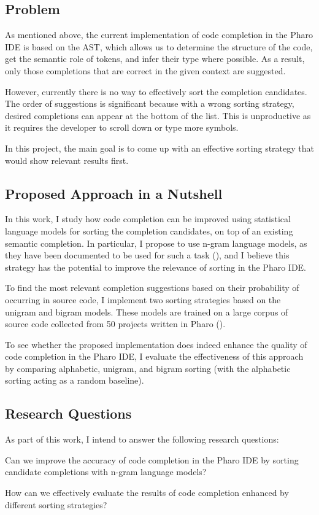 \documentclass[sigplan,screen]{acmart}
\begin{document}
\subsection{Problem}
As mentioned above, the current implementation of code completion in the Pharo IDE is based on the AST, which allows us to determine the structure of the code, get the semantic role of tokens, and infer their type where possible. As a result, only those completions that are correct in the given context are suggested.

However, currently there is no way to effectively sort the completion candidates. The order of suggestions is significant because with a wrong sorting strategy, desired completions can appear at the bottom of the list. This is unproductive as it requires the developer to scroll down or type more symbols. 

In this project, the main goal is to come up with an effective sorting strategy that would show relevant results first. 

\subsection{Proposed Approach in a Nutshell}
In this work, I study how code completion can be improved using statistical language models for sorting the completion candidates, on top of an existing semantic completion. In particular, I propose to use n-gram language models, as they have been documented to be used for such a task (\cite{Hind12a}), and I believe this strategy has the potential to improve the relevance of sorting in the Pharo IDE.

To find the most relevant completion suggestions based on their probability of occurring in source code, I implement two sorting strategies based on the unigram and bigram models. These models are trained on a large corpus of source code collected from 50 projects written in Pharo (\cite{Zait20a}).

To see whether the proposed implementation does indeed enhance the quality of code completion in the Pharo IDE, I evaluate the effectiveness of this approach by comparing alphabetic, unigram, and bigram sorting (with the alphabetic sorting acting as a random baseline).

\subsection{Research Questions}
As part of this work, I intend to answer the following research questions:
\begin{RQ}
    \item Can we improve the accuracy of code completion in the Pharo IDE by sorting candidate completions with n-gram language models?
    \item How can we effectively evaluate the results of code completion enhanced by different sorting strategies?
\end{RQ}
\end{document}
